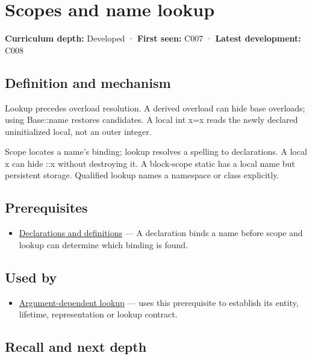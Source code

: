 \hypertarget{appendix-b12b31759da1}{}\label{referencestart:appendix-b12b31759da1}
\section{Scopes and name lookup}\label{appendix-b12b31759da1-scopes-and-name-lookup}

\textbf{Curriculum depth:} Developed · \textbf{First seen:} C007 · \textbf{Latest development:} C008

\subsection{Definition and mechanism}\label{appendix-b12b31759da1-definition-and-mechanism}

Lookup precedes overload resolution. A derived overload can hide base overloads; using Base::name restores candidates. A local int x=x reads the newly declared uninitialized local, not an outer integer.

Scope locates a name's binding; lookup resolves a spelling to declarations. A local x can hide ::x without destroying it. A block-scope static has a local name but persistent storage. Qualified lookup names a namespace or class explicitly.

\subsection{Prerequisites}\label{appendix-b12b31759da1-prerequisites}

\begin{itemize}
\tightlist
\item
  \hyperref[appendix-2e4d494c2d94]{Declarations and definitions} --- A declaration binds a name before scope and lookup can determine which binding is found.
\end{itemize}

\subsection{Used by}\label{appendix-b12b31759da1-used-by}

\begin{itemize}
\tightlist
\item
  \hyperref[appendix-7863714aa97f]{Argument-dependent lookup} --- uses this prerequisite to establish its entity, lifetime, representation or lookup contract.
\end{itemize}

\subsection{Recall and next depth}\label{appendix-b12b31759da1-recall-and-next-depth}


